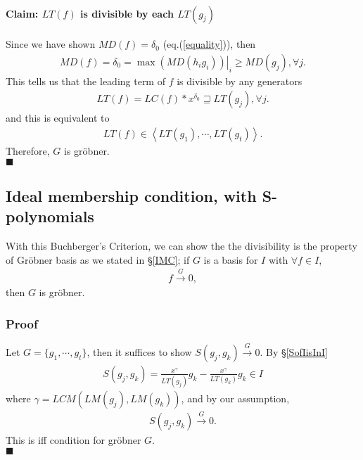 \documentclass[11pt]{book}
\begin{document}
\paragraph{Claim: $LT(f)$ is divisible by each $LT(g_j)$}
Since we have shown $MD(f) = \delta_0$ (eq.(\ref{equality})), then
\begin{eqnarray}
MD(f) = \delta_0 = \left. \max\left(MD(h_i g_i) \right) \right|_i \geq MD(g_j), \forall j.
\end{eqnarray}
This tells us that the leading term of $f$ is divisible by any generators
\begin{eqnarray}
LT(f) = LC(f) * x^{\delta_0} \sqsupseteq LT(g_j), \forall j.
\end{eqnarray}
and this is equivalent to
\begin{eqnarray}
LT(f) \in \left< LT(g_1), \cdots, LT(g_t) \right>.
\end{eqnarray}
Therefore, $G$ is gr\"obner.\\
$\blacksquare$

\subsection{Ideal membership condition, with S-polynomials}
\label{isGroebner2}
With this Buchberger's Criterion, we can show the the divisibility is the property of Gr\"obner basis as we stated in \S\ref{IMC}; if $G$ is a basis for $I$ with $\forall f \in I$,
\begin{eqnarray}
f \stackrel{G}{\to} 0,
\end{eqnarray}
then $G$ is gr\"obner.

\subsubsection{Proof}
Let $G = \{g_1, \cdots, g_t\}$, then it suffices to show $S(g_j, g_k) \stackrel{G}{\to} 0$.
By \S\ref{SofIisInI}
\begin{eqnarray}
S(g_j, g_k) = \frac{x^\gamma}{LT(g_j)}g_k - \frac{x^\gamma}{LT(g_k)}g_k \in I
\end{eqnarray}
where $\gamma = LCM \left( LM(g_j), LM(g_k)\right)$, and by our assumption,
\begin{eqnarray}
S(g_j, g_k) \stackrel{G}{\to} 0.
\end{eqnarray}
This is iff condition for gr\"obner $G$.\\
$\blacksquare$
\end{document}

